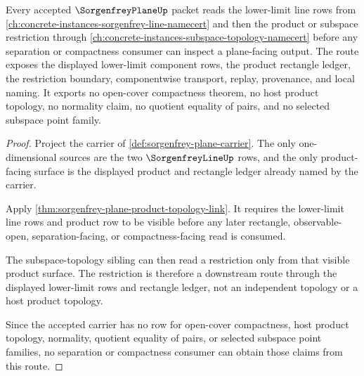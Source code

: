 \begin{theorem}
\label{thm:sorgenfrey-plane-subspace-topology-route}
Every accepted $\SorgenfreyPlaneUp$ packet reads the lower-limit line rows from \autoref{ch:concrete-instances-sorgenfrey-line-namecert} and then the product or subspace restriction through \autoref{ch:concrete-instances-subspace-topology-namecert} before any separation or compactness consumer can inspect a plane-facing output. The route exposes the displayed lower-limit component rows, the product rectangle ledger, the restriction boundary, componentwise transport, replay, provenance, and local naming. It exports no open-cover compactness theorem, no host product topology, no normality claim, no quotient equality of pairs, and no selected subspace point family.
\end{theorem}
\begin{proof}
Project the carrier of \autoref{def:sorgenfrey-plane-carrier}. The only one-dimensional sources are the two $\SorgenfreyLineUp$ rows, and the only product-facing surface is the displayed product and rectangle ledger already named by the carrier.

Apply \autoref{thm:sorgenfrey-plane-product-topology-link}. It requires the lower-limit line rows and product row to be visible before any later rectangle, observable-open, separation-facing, or compactness-facing read is consumed.

The subspace-topology sibling can then read a restriction only from that visible product surface. The restriction is therefore a downstream route through the displayed lower-limit rows and rectangle ledger, not an independent topology or a host product topology.

Since the accepted carrier has no row for open-cover compactness, host product topology, normality, quotient equality of pairs, or selected subspace point families, no separation or compactness consumer can obtain those claims from this route.
\end{proof}
